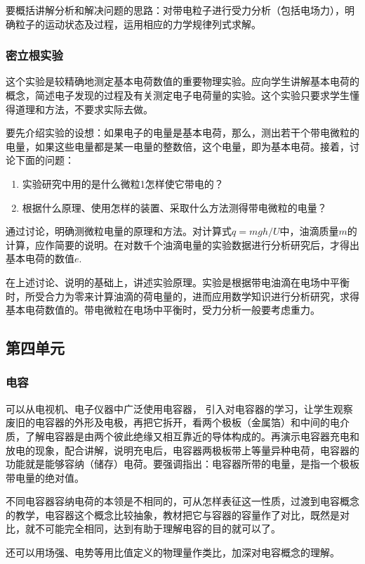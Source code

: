 要概括讲解分析和解决问题的思路：对带电粒子进行受力分析（包括电场力），明确粒子的运动状态及过程，运用相应的力学规律列式求解。

\subsubsection{密立根实验}

这个实验是较精确地测定基本电荷数值的重要物理实验。应向学生讲解基本电荷的概念，简述电子发现的过程及有关测定电子电荷量的实验。这个实验只要求学生懂得道理和方法，不要求实际去做。

要先介绍实验的设想：如果电子的电量是基本电荷，那么，测出若干个带电微粒的电量，如果这些电量都是某一电量的整数倍，这个电量，即为基本电荷。接着，讨论下面的问题：
\begin{enumerate}
\item 实验研究中用的是什么微粒1怎样使它带电的？
\item 根据什么原理、使用怎样的装置、采取什么方法测得带电微粒的电量？
\end{enumerate}
通过讨论，明确测微粒电量的原理和方法。对计算式$q=mgh/U$中，油滴质量$m$的计算，应作简要的说明。在对数千个油滴电量的实验数据进行分析研究后，才得出基本电荷的数值$e$.

在上述讨论、说明的基础上，讲述实验原理。实验是根据带电油滴在电场中平衡时，所受合力为零来计算油滴的荷电量的，进而应用数学知识进行分析研究，求得基本电荷数值的。带电微粒在电场中平衡时，受力分析一般要考虑重力。

\subsection{第四单元}
\subsubsection{电容}

可以从电视机、电子仪器中广泛使用电容器，
引入对电容器的学习，让学生观察废旧的电容器的外形及电极，再把它拆开，看两个极板（金属箔）和中间的电介质，了解电容器是由两个彼此绝缘又相互靠近的导体构成的。再演示电容器充电和放电的现象，配合讲解，说明充电后，电容器两极板带上等量异种电荷，电容器的功能就是能够容纳（储存）电荷。要强调指出：电容器所带的电量，是指一个极板带电量的绝对值。

不同电容器容纳电荷的本领是不相同的，可从怎样表征这一性质，过渡到电容概念的教学，电容器这个概念比较抽象，教材把它与容器的容量作了对比，既然是对比，就不可能完全相同，达到有助于理解电容的目的就可以了。

还可以用场强、电势等用比值定义的物理量作类比，加深对电容概念的理解。

